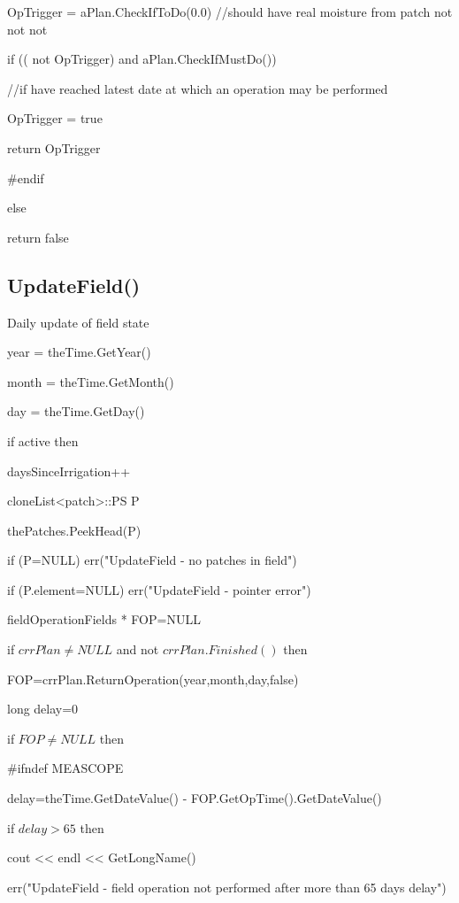 \documentclass[%
]{scrartcl}
\begin{document}
{{      OpTrigger = aPlan.CheckIfToDo(0.0)    //should have real moisture from patch not  not  not 
      
      if (( not OpTrigger) and  aPlan.CheckIfMustDo()) 
     
      \quad	 //if have reached latest date at which an operation may be performed
     
    \quad	      	OpTrigger = true
         	
      return OpTrigger
      
\#endif
	
   else
   
   \quad 	return false





\subsection{UpdateField()}
Daily update of field state

    year = theTime.GetYear()
    
    month = theTime.GetMonth()
    
    day = theTime.GetDay()

   if active then

      daysSinceIrrigation++
      
      cloneList<patch>::PS P
      
      thePatches.PeekHead(P)
      
      if (P=NULL)
         err("UpdateField - no patches in field")
    
      if (P.element=NULL)
         err("UpdateField - pointer error")
      
      fieldOperationFields * FOP=NULL
     
      if $crrPlan \ne NULL$ and  not $crrPlan.Finished()$ then
       
      \quad    FOP=crrPlan.ReturnOperation(year,month,day,false)
      
      long  delay=0
    
      if $FOP\ne NULL$ then
    
\#ifndef MEASCOPE
 
  \quad        delay=theTime.GetDateValue() - FOP.GetOpTime().GetDateValue()
 
  \quad        if $delay>65$ then
         
\quad   \quad           cout << endl << GetLongName()

 \quad   \quad          err("UpdateField - field operation not performed after more than 65 days delay")
         
}}
\end{document}
